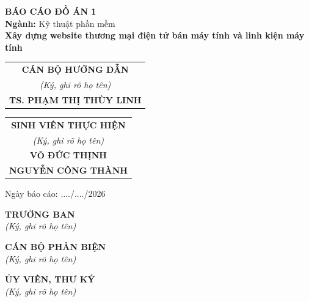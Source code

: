 \begin{center}
    \large\textbf{BÁO CÁO ĐỒ ÁN 1} \\[\baselineskip]
    \textbf{Ngành:} Kỹ thuật phần mềm \\[2cm]

    \Large\textbf{Xây dựng website thương mại điện tử bán máy tính và linh kiện máy tính}
\end{center}

\vfill %

\noindent %
\begin{tabular}{@{}c@{}}
    \textbf{CÁN BỘ HƯỚNG DẪN}\\
    \textit{(Ký, ghi rõ họ tên)}\\[2cm]
    \textbf{TS. PHẠM THỊ THÙY LINH}
\end{tabular}
\hfill %
\begin{tabular}{@{}c@{}}
    \textbf{SINH VIÊN THỰC HIỆN}\\
    \textit{(Ký, ghi rõ họ tên)}\\[2cm]
    \textbf{VÕ ĐỨC THỊNH}\\[1.5cm]
    \textbf{NGUYỄN CÔNG THÀNH}

\end{tabular}

\vfill %

\begin{center}
    Ngày báo cáo: ..../..../2026
\end{center}

\vspace{15pt} %

\noindent
\begin{minipage}[t]{0.32\textwidth}
    \centering
    \textbf{TRƯỞNG BAN}\\
    \textit{(Ký, ghi rõ họ tên)}\\[3cm]
\end{minipage}
\hfill
\begin{minipage}[t]{0.32\textwidth}
    \centering
    \textbf{CÁN BỘ PHẢN BIỆN}\\
    \textit{(Ký, ghi rõ họ tên)}\\[3cm]
\end{minipage}
\hfill
\begin{minipage}[t]{0.32\textwidth}
    \centering
    \textbf{ỦY VIÊN, THƯ KÝ}\\
    \textit{(Ký, ghi rõ họ tên)}\\[3cm]
\end{minipage}